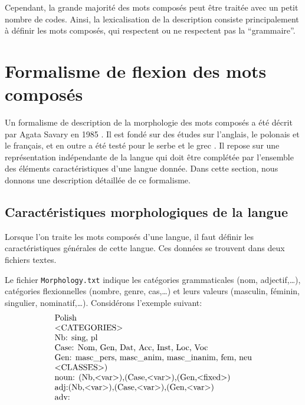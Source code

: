 \bigskip
\noindent Cependant, la grande majorité des mots composés peut être traitée avec un petit nombre de codes. Ainsi, la lexicalisation de la
description consiste principalement à définir les mots composés, qui respectent ou ne respectent pas
la  ``grammaire''.

\section{Formalisme de flexion des mots composés}
\label{section:formalism}
Un formalisme de description de la morphologie des mots composés a été décrit par Agata Savary en
1985 \cite{Savary05}. Il est fondé sur des études sur l'anglais, le polonais et le français, et
en outre a été testé pour le serbe \cite{Krstevetal06} et le grec \cite{Foufi13}.
Il repose sur une représentation indépendante de la langue qui doit être complétée par l'ensemble des éléments caractéristiques 
d'une langue donnée. Dans cette section, nous donnons une description détaillée de ce formalisme.

\subsection{Caractéristiques morphologiques de la langue}
\label{subsec:langfeat}
Lorsque l'on traite les mots composés d'une langue, il faut définir les caractéristiques générales
de cette langue. Ces données se trouvent dans deux fichiers textes.

\bigskip
\noindent Le fichier \verb+Morphology.txt+  indique les catégories grammaticales
(nom, adjectif,\dots), catégories flexionnelles (nombre, genre, cas,\dots) et leurs valeurs 
(masculin, féminin, singulier, nominatif,\dots). Considérons l'exemple suivant:
\[
\begin{array}[c]{ll}
$Polish$ \\
$$<$CATEGORIES$>$$ \\
$Nb: sing, pl$ \\
$Case: Nom, Gen, Dat, Acc, Inst, Loc, Voc$ \\
$Gen: masc\_pers, masc\_anim, masc\_inanim, fem, neu$ \\
$$<$CLASSES$>$)$ \\
$noun: (Nb,$<$var$>$),(Case,$<$var$>$),(Gen,$<$fixed$>$)$ \\
$adj:(Nb,$<$var$>$),(Case,$<$var$>$),(Gen,$<$var$>$)$ \\
$adv:$
\end{array}
\]

